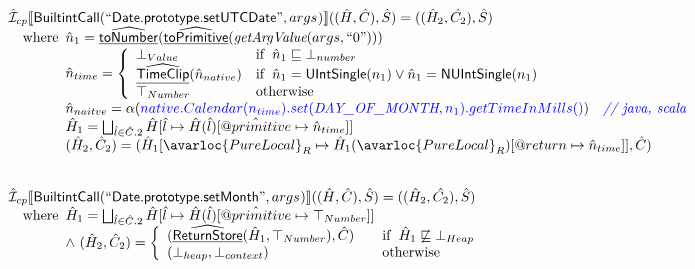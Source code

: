 \[\begin{array}{l}
\aI _{cp}\lbr \SF{BuiltintCall}(``\SF{Date.prototype.setUTCDate}",args_{})\rbr((\hat{H},\hat{C}), \hat{S})
  = ((\hat{H}_2, \hat{C_2}), \hat{S})\\
\quad\wherec{
  \hat{n}_{1} = \ahf{toNumber}(\ahf{toPrimitive}(\hf{getArgValue}(args, ``0")))\\
  \hat{n}_{time} = \left\{\begin{array}{ll}
      \bot_{Value} & \ifc{\hat{n}_{1} \sqsubseteq  \bot_{number}}\\
      \ahf{TimeClip}(\hat{n}_{native})
      & \ifc{\hat{n}_{1} = \SF{UIntSingle}(n_{1}) \lor \hat{n}_{1} = \SF{NUIntSingle}(n_{1}) }\\
      \top_{Number} & \owc
    \end{array}\right.\\
  \hat{n}_{naitve} = \alpha({\inblue native.Calendar(n_{time}).set(\emph{DAY\_OF\_MONTH}, n_{1}).getTimeInMills()})
    \quad\comment{{\inblue // java, scala}}\\  
  \hat{H}_1 = \bigsqcup_{\hat{l} \in \hat{C}.2} \hat{H}[\hat{l}
    \mapsto \hat{H}(\hat{l})[\avarprop{primitive} \mapsto \hat{n}_{time}]]\\
  (\hat{H}_2, \hat{C}_2) = 
    (\hat{H}_1[\avarloc{PureLocal}_R \mapsto \hat{H}_1(\avarloc{PureLocal}_R)
      [\varprop{return} \mapsto \hat{n}_{time}]], \hat{C})\\
  }\\
\\\\

\aI _{cp}\lbr \SF{BuiltintCall}(``\SF{Date.prototype.setMonth}",args_{})\rbr((\hat{H},\hat{C}), \hat{S})
  = ((\hat{H}_2, \hat{C_2}), \hat{S})\\
\quad\wherec{
  \hat{H}_1 = \bigsqcup_{\hat{l} \in \hat{C}.2} \hat{H}[\hat{l}
    \mapsto \hat{H}(\hat{l})[\avarprop{primitive} \mapsto \top_{Number}]]\\
  \land\ (\hat{H}_2, \hat{C}_2) = 
    \left\{\begin{array}{l@{\quad\quad}l}
      (\ahf{ReturnStore}(\hat{H}_1, \top_{Number}), \hat{C})
      & \ifc{\hat{H}_1 \not\sqsubseteq \bot_{Heap}}\\
      (\bot_{heap}, \bot_{context}) & \owc \\
    \end{array}\right.\\
  }\\
\\\\



\end{array}\]
